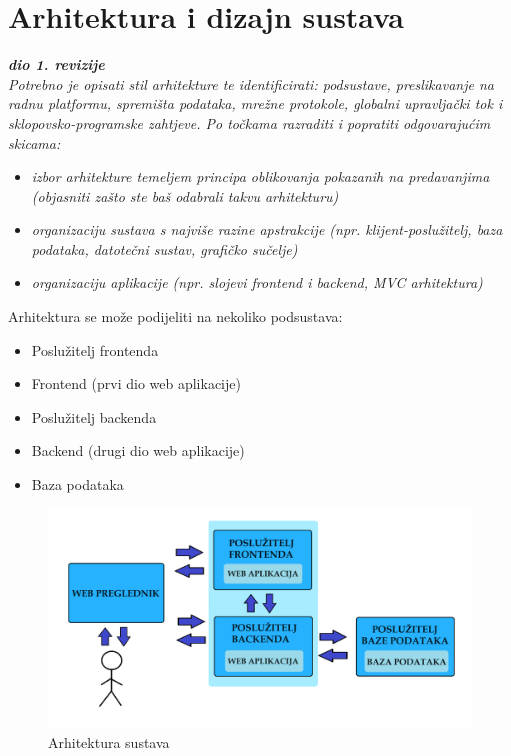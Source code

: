 \chapter{Arhitektura i dizajn sustava}
		
		\textbf{\textit{dio 1. revizije}}\\

		\textit{ Potrebno je opisati stil arhitekture te identificirati: podsustave, preslikavanje na radnu platformu, spremišta podataka, mrežne protokole, globalni upravljački tok i sklopovsko-programske zahtjeve. Po točkama razraditi i popratiti odgovarajućim skicama:}
	\begin{itemize}
		\item 	\textit{izbor arhitekture temeljem principa oblikovanja pokazanih na predavanjima (objasniti zašto ste baš odabrali takvu arhitekturu)}
		\item 	\textit{organizaciju sustava s najviše razine apstrakcije (npr. klijent-poslužitelj, baza podataka, datotečni sustav, grafičko sučelje)}
		\item 	\textit{organizaciju aplikacije (npr. slojevi frontend i backend, MVC arhitektura) }		
	\end{itemize}
	
		Arhitektura se može podijeliti na nekoliko podsustava:
		 \begin{itemize}
			\item Poslužitelj frontenda
			\item Frontend (prvi dio web aplikacije)
			\item Poslužitelj backenda
			\item Backend (drugi dio web aplikacije)
			\item Baza podataka 
		\end{itemize}
		
		\begin{figure}[H]
			\includegraphics[width=\textwidth]{slike/arhitekturaSustava.PNG} %
			\caption{Arhitektura sustava}
			\label{fig:promjene9} %
		\end{figure}
		
